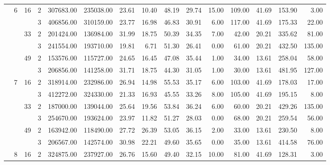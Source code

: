 \begin{tabular}{llllrrrrrrrrrrr}
\cline{2-15}
\cline{3-15}
                & \multirow{6}{*}{6} & \multirow{2}{*}{16} & 2 & 307683.00 & 235038.00 & 23.61 &   10.40 &   48.19 &   29.74 &   15.00 &  109.00 &   41.69 & 153.90 &     3.00 \\
                &   &    & 3 & 406856.00 & 310159.00 & 23.77 &   16.98 &   46.83 &   30.91 &    6.00 &  117.00 &   41.69 & 175.33 &    22.00 \\
\cline{3-15}
                &   & \multirow{2}{*}{33} & 2 & 201424.00 & 136984.00 & 31.99 &   18.75 &   50.39 &   34.35 &    7.00 &   42.00 &   20.21 & 335.62 &    81.00 \\
                &   &    & 3 & 241554.00 & 193710.00 & 19.81 &    6.71 &   51.30 &   26.41 &    0.00 &   61.00 &   20.21 & 432.50 &   135.00 \\
\cline{3-15}
                &   & \multirow{2}{*}{49} & 2 & 153576.00 & 115727.00 & 24.65 &   16.45 &   47.08 &   35.44 &    1.00 &   34.00 &   13.61 & 258.04 &    58.00 \\
                &   &    & 3 & 206856.00 & 141258.00 & 31.71 &   18.75 &   44.30 &   31.05 &    1.00 &   30.00 &   13.61 & 481.95 &   127.00 \\
\cline{2-15}
\cline{3-15}
                & \multirow{6}{*}{7} & \multirow{2}{*}{16} & 2 & 318914.00 & 232986.00 & 26.94 &   14.98 &   55.53 &   35.17 &    6.00 &  103.00 &   41.69 & 178.03 &    17.00 \\
                &   &    & 3 & 412272.00 & 324330.00 & 21.33 &   16.93 &   45.55 &   33.26 &    8.00 &  105.00 &   41.69 & 195.15 &     8.00 \\
\cline{3-15}
                &   & \multirow{2}{*}{33} & 2 & 187000.00 & 139044.00 & 25.64 &   19.56 &   53.84 &   36.24 &    6.00 &   60.00 &   20.21 & 429.26 &   135.00 \\
                &   &    & 3 & 254670.00 & 193624.00 & 23.97 &   11.82 &   51.27 &   28.03 &    0.00 &   68.00 &   20.21 & 259.54 &    56.00 \\
\cline{3-15}
                &   & \multirow{2}{*}{49} & 2 & 163942.00 & 118490.00 & 27.72 &   26.39 &   53.05 &   36.15 &    2.00 &   33.00 &   13.61 & 230.50 &     8.00 \\
                &   &    & 3 & 206567.00 & 142574.00 & 30.98 &   22.21 &   49.60 &   35.65 &    0.00 &   35.00 &   13.61 & 414.58 &    76.00 \\
\cline{2-15}
\cline{3-15}
                & \multirow{6}{*}{8} & \multirow{2}{*}{16} & 2 & 324875.00 & 237927.00 & 26.76 &   15.60 &   49.40 &   32.15 &   10.00 &   81.00 &   41.69 & 128.31 &     3.00 \\

\end{tabular}
